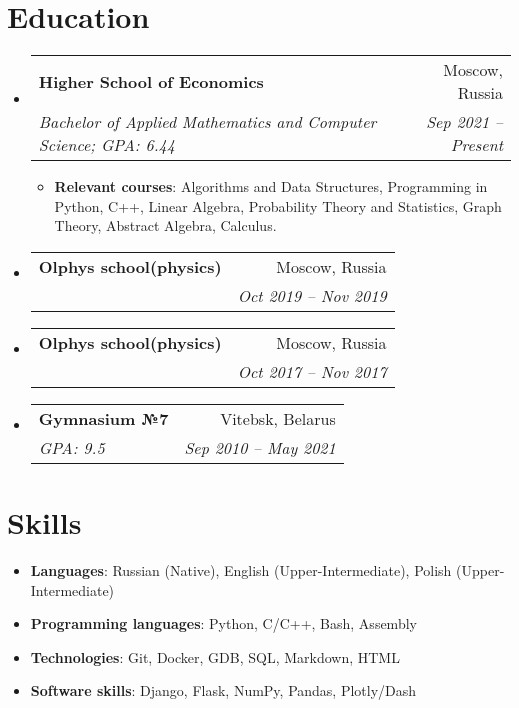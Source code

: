 \documentclass{resume}
\makeatletter
\newcommand{\resumeItem}[2]{
  \item\small{
    \textbf{#1}{: #2 \vspace{-2pt}}
  }
}
\newcommand{\resumeSubheading}[4]{
  \vspace{-1pt}\item
    \begin{tabular*}{0.97\textwidth}[t]{l@{\extracolsep{\fill}}r}
      \textbf{#1} & #2 \\
      \textit{\small#3} & \textit{\small #4} \\
    \end{tabular*}\vspace{-5pt}
}
\newcommand{\resumeSubHeadingListStart}{\begin{itemize}[leftmargin=*]}
\newcommand{\resumeSubHeadingListEnd}{\end{itemize}}
\newcommand{\resumeItemListStart}{\begin{itemize}}
\newcommand{\resumeItemListEnd}{\end{itemize}\vspace{-5pt}}
\makeatother
\begin{document}
\section{Education}
  \resumeSubHeadingListStart
    \resumeSubheading
      {Higher School of Economics}{Moscow, Russia}
      {Bachelor of Applied Mathematics and Computer Science;  GPA: 6.44}{Sep 2021 -- Present}
      \resumeItemListStart
      \medskip
      \resumeItem{Relevant courses} {Algorithms and Data Structures, Programming in Python, C++, Linear Algebra, Probability Theory and Statistics, Graph Theory, Abstract Algebra, Calculus.}
      \resumeItemListEnd
      \bigskip
      \resumeSubheading
        {Olphys school(physics)}{Moscow, Russia}{}{Oct 2019 -- Nov 2019}
        \bigskip
      \resumeSubheading
        {Olphys school(physics)}{Moscow, Russia}{}{Oct 2017 -- Nov 2017}
        \bigskip
      \resumeSubheading
        {Gymnasium №7}{Vitebsk, Belarus}{GPA: 9.5}{Sep 2010 -- May 2021}
  \resumeSubHeadingListEnd

\section{Skills}
 \resumeSubHeadingListStart
    \item{
    \textbf{Languages}{: Russian (Native), English (Upper-Intermediate), Polish (Upper-Intermediate)}
    }
    \smallskip
   \item{
     \textbf{Programming languages}{: Python, C/C++, Bash, Assembly}
   }
   \smallskip
   \item{\textbf{Technologies}{: Git, Docker, GDB, SQL, Markdown, HTML}}
   \smallskip
   \item{\textbf{Software skills}{: Django, Flask, NumPy, Pandas, Plotly/Dash}}
 \resumeSubHeadingListEnd
\end{document}
